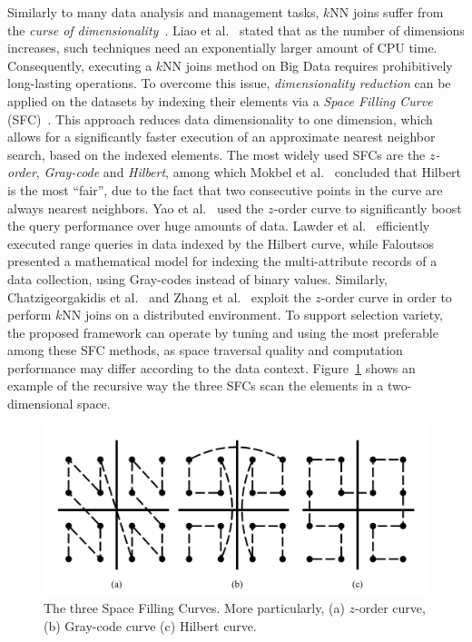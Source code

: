 Similarly to many data analysis and management tasks, $k$NN joins suffer from the \textit{curse of dimensionality}~\cite{berchtold1998his}. Liao et al.~\cite{liao2001SFC} stated that as the number of dimensions increases, such techniques need an exponentially larger amount of CPU time. Consequently, executing a $k$NN joins method on Big Data requires prohibitively long-lasting operations. To overcome this issue, \textit{dimensionality reduction} can be applied on the datasets by indexing their elements via a \textit{Space Filling Curve} (SFC)~\cite{sagan2012space}. This approach reduces data dimensionality to one dimension, which allows for a significantly faster execution of an approximate nearest neighbor search, based on the indexed elements. The most widely used SFCs are the \textit{$z$-order}, \textit{Gray-code} and \textit{Hilbert}, among which Mokbel et al.~\cite{mokbel2002pms} concluded that Hilbert is the most ``fair'', due to the fact that two consecutive points in the curve are always nearest neighbors. Yao et al.~\cite{yao2010knn} used the $z$-order curve to significantly boost the query performance over huge amounts of data. Lawder et al.~\cite{lawder2001qmd} efficiently executed range queries in data indexed by the Hilbert curve, while Faloutsos~\cite{faloutsos1986mhu} presented a mathematical model for indexing the multi-attribute records of a data collection, using Gray-codes instead of binary values. Similarly, Chatzigeorgakidis et al.~\cite{chatzigeorgakidis2015mapreduce} and Zhang et al.~\cite{zhang2012epk} exploit the $z$-order curve in order to perform $k$NN joins on a distributed environment. To support selection variety, the proposed framework can operate by tuning and using the most preferable among these SFC methods, as space traversal quality and computation performance may differ according to the data context. Figure~\ref{figure1} shows an example of the recursive way the three SFCs scan the elements in a two-dimensional space.

\begin{figure}[h!]
	\centering
	\includegraphics[width=\textwidth]{figures/figure1.png}
	\caption{The three Space Filling Curves. Μore particularly, (a) $z$-order curve, (b) Gray-code curve (c) Hilbert curve.}
	\label{figure1}
\end{figure}

